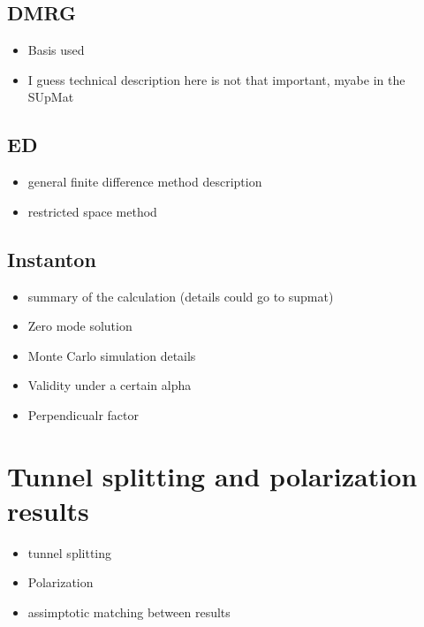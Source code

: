 \documentclass[prb,twocolumn,showpacs,preprintnumbers,amsmath,amssymb, superscriptaddress]{revtex4-2}
\newcommand{\1}{{1\hspace*{-0.5ex} \textrm{l} \hspace*{0.5ex}}}
\begin{document}
\subsection{DMRG}
\begin{itemize}
\item Basis used
\item I guess technical description here is not that important, myabe in the SUpMat
\end{itemize}

\subsection{ED}
\begin{itemize}
\item general finite difference method description
\item restricted space method
\end{itemize}

\subsection{Instanton}
\begin{itemize}
\item summary of the calculation (details could go to supmat)
\item Zero mode solution
\item Monte Carlo simulation details
\item Validity under a certain alpha
\item Perpendicualr factor
\end{itemize}

     
\section{Tunnel splitting and polarization results}
\begin{itemize}
\item tunnel splitting 
\item Polarization
\item assimptotic matching between results
\end{itemize}
\end{document}

